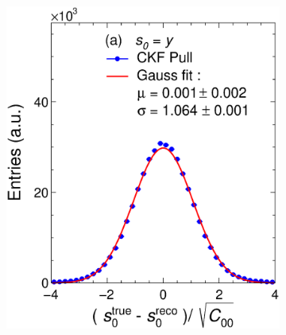 \begin{figure}[!ht]
     \centering
     \begin{subfigure}{0.32\textwidth}
         \centering
         \includegraphics[width=\textwidth]{figures/ch5-KF_NDGAr/ToySample/ParScan/UnitK_p0.eps}
         \caption{}
         \label{fig:resp0KFGAr}
     \end{subfigure}
     \begin{subfigure}{0.32\textwidth}
         \centering

\end{subfigure}
\end{figure}
